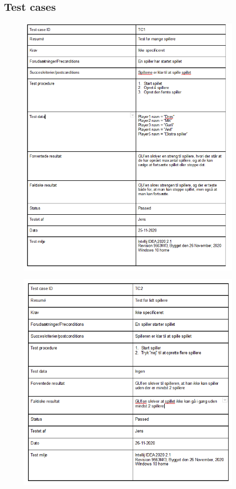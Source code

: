 \subsection{Test cases}
\begin{figure}[h!]
\centering
\includegraphics[scale=1]{artifacts/TC1.png}
\end{figure}

\newpage
\begin{figure}[h!]
\centering
\includegraphics[scale=1]{artifacts/TC2.png}
\end{figure}

